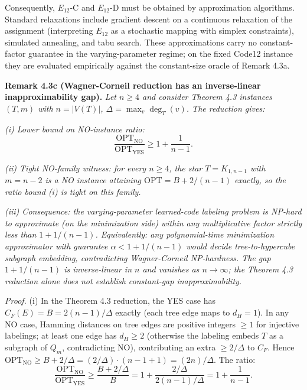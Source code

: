 \documentclass[
]{article}
\begin{document}
Consequently, $E_{12}$-C and $E_{12}$-D must be obtained by
approximation algorithms. Standard relaxations include gradient
descent on a continuous relaxation of the assignment (interpreting
$E_{12}$ as a stochastic mapping with simplex constraints), simulated
annealing, and tabu search. These approximations carry no
constant-factor guarantee in the varying-parameter regime; on the
fixed Code12 instance they are evaluated empirically against the
constant-size oracle of Remark 4.3a.

\textbf{Remark 4.3c (Wagner-Corneil reduction has an inverse-linear
inapproximability gap).}
\emph{Let $n \geq 4$ and consider Theorem 4.3 instances $(T, m)$ with
$n = |V(T)|$, $\Delta = \max_v \deg_T(v)$. The reduction gives:}

\emph{(i) Lower bound on NO-instance ratio:}
\[
\frac{\mathrm{OPT}_{\mathrm{NO}}}{\mathrm{OPT}_{\mathrm{YES}}} \geq 1 + \frac{1}{n-1}.
\]

\emph{(ii) Tight NO-family witness: for every $n \geq 4$, the star
$T = K_{1, n-1}$ with $m = n - 2$ is a NO instance attaining
$\mathrm{OPT} = B + 2/(n - 1)$ exactly, so the ratio bound (i) is
tight on this family.}

\emph{(iii) Consequence: the varying-parameter learned-code labeling
problem is NP-hard to approximate (on the minimization side) within
any multiplicative factor strictly less than $1 + 1/(n - 1)$.
Equivalently: any polynomial-time minimization approximator with
guarantee $\alpha < 1 + 1/(n - 1)$ would decide tree-to-hypercube
subgraph embedding, contradicting Wagner-Corneil NP-hardness. The
gap $1 + 1/(n - 1)$ is inverse-linear in $n$ and vanishes as
$n \to \infty$; the Theorem 4.3 reduction alone does not establish
constant-gap inapproximability.}

\emph{Proof.} (i) In the Theorem 4.3 reduction, the YES case has
$C_F(E) = B = 2(n-1)/\Delta$ exactly (each tree edge maps to $d_H = 1$).
In any NO case, Hamming distances on tree edges are positive integers
$\geq 1$ for injective labelings; at least one edge has $d_H \geq 2$
(otherwise the labeling embeds $T$ as a subgraph of $Q_m$, contradicting
NO), contributing an extra $\geq 2/\Delta$ to $C_F$. Hence
$\mathrm{OPT}_{\mathrm{NO}} \geq B + 2/\Delta = (2/\Delta) \cdot
(n-1 + 1) = (2n)/\Delta$. The ratio:
\[
\frac{\mathrm{OPT}_{\mathrm{NO}}}{\mathrm{OPT}_{\mathrm{YES}}}
\geq \frac{B + 2/\Delta}{B}
= 1 + \frac{2/\Delta}{2(n-1)/\Delta}
= 1 + \frac{1}{n-1}.
\]
\end{document}
